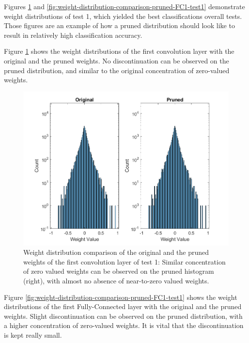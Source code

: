Figures \ref{fig:weight-distribution-comparison-pruned-conv1-test1} and \ref{fig:weight-distribution-comparison-pruned-FC1-test1} demonstrate weight distributions of test 1, which yielded the best classifications overall tests. Those figures are an example of how a pruned distribution should look like to result in relatively high classification accuracy.

Figure \ref{fig:weight-distribution-comparison-pruned-conv1-test1} shows the weight distributions of the first convolution layer with the original and the pruned weights. No discontinuation can be observed on the pruned distribution, and similar to the original concentration of zero-valued weights.

\begin{figure} [H]
	\centering
	\includegraphics[width=\textwidth]{Images/Weights-distributions/pruned/37.97/weight-distribution-conv1.png}
	\decoRule
	\caption[Weight distribution comparison of the original and the pruned weights of the first convolution layer of test 1]{Weight distribution comparison of the original and the pruned weights of the first convolution layer of test 1: Similar concentration of zero valued weights can be observed on the pruned histogram (right), with almost no absence of near-to-zero valued weights.}
	\label{fig:weight-distribution-comparison-pruned-conv1-test1}
\end{figure}

Figure \ref{fig:weight-distribution-comparison-pruned-FC1-test1} shows the weight distributions of the first Fully-Connected layer with the original and the pruned weights. Slight discontinuation can be observed on the pruned distribution, with a higher concentration of zero-valued weights. It is vital that the discontinuation is kept really small.

